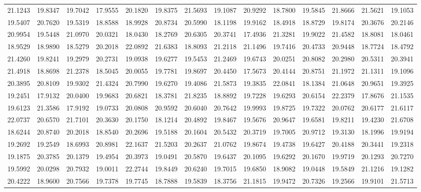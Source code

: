 \documentclass[12pt]{article}\usepackage[]{graphicx}\usepackage[]{color}
\begin{document}
\begin{landscape}
\begin{longtable}[t]{rrrrrrrrrrrrrr}
21.1243 & 19.8347 & 19.7042 & 17.9555 & 20.1820 & 19.8375 & 21.5693 & 19.1087 & 20.9292 & 18.7800 & 19.5845 & 21.8666 & 21.5621 & 19.1053\\
19.5407 & 20.7620 & 19.5319 & 18.8588 & 18.9928 & 20.8734 & 20.5990 & 18.1198 & 19.9162 & 18.4918 & 18.8729 & 19.8174 & 20.3676 & 20.2146\\
20.9954 & 19.5448 & 21.0970 & 20.0321 & 18.0430 & 18.2769 & 20.6305 & 20.3741 & 17.4936 & 21.3281 & 19.9022 & 21.4582 & 18.8081 & 18.0461\\
18.9529 & 18.9890 & 18.5279 & 20.2018 & 22.0892 & 21.6383 & 18.8093 & 21.2118 & 21.1496 & 19.7416 & 20.4733 & 20.9448 & 18.7724 & 18.4792\\
21.4260 & 19.8241 & 19.2979 & 20.2731 & 19.0938 & 19.6277 & 19.5453 & 21.2469 & 19.6743 & 20.0251 & 20.8082 & 20.2980 & 20.5311 & 20.3941\\
21.4918 & 18.8698 & 21.2378 & 18.5045 & 20.0055 & 19.7781 & 19.8697 & 20.4450 & 17.5673 & 20.4144 & 20.8751 & 21.1972 & 21.1311 & 19.1096\\
20.3895 & 20.8109 & 19.9302 & 21.4324 & 20.7990 & 19.6270 & 19.4086 & 21.5873 & 19.3835 & 22.0841 & 18.1384 & 21.0648 & 20.9651 & 19.3925\\
19.2451 & 17.9132 & 20.0400 & 19.9683 & 20.6821 & 18.3781 & 21.8235 & 18.8892 & 19.7228 & 19.6293 & 20.6154 & 22.2379 & 17.8676 & 21.1535\\
19.6123 & 21.3586 & 17.9192 & 19.0733 & 20.0808 & 20.9592 & 20.6040 & 20.7642 & 19.9993 & 19.8725 & 19.7322 & 20.0762 & 20.6177 & 21.6117\\
22.0737 & 20.6570 & 21.7101 & 20.3630 & 20.1750 & 18.1214 & 20.4892 & 19.8467 & 19.5676 & 20.9647 & 19.6581 & 19.8211 & 19.4230 & 21.6708\\
18.6244 & 20.8740 & 20.2018 & 18.8540 & 20.2696 & 19.5188 & 20.1604 & 20.5432 & 20.3719 & 19.7005 & 20.9712 & 19.3130 & 18.1996 & 19.9194\\
19.2692 & 19.2549 & 18.6993 & 20.8981 & 22.1637 & 21.5203 & 20.2637 & 21.0762 & 19.8674 & 19.4738 & 19.6427 & 20.4188 & 20.3441 & 19.2318\\
19.1875 & 20.3785 & 20.1379 & 19.4954 & 20.3973 & 19.0491 & 20.5870 & 19.6437 & 20.1095 & 19.6292 & 20.1670 & 19.9719 & 20.1293 & 20.7270\\
19.5992 & 20.0298 & 20.7932 & 19.0011 & 22.2744 & 19.8449 & 20.6240 & 19.7015 & 19.6850 & 18.9082 & 19.0448 & 19.5849 & 21.1216 & 19.1282\\
20.4222 & 18.9600 & 20.7566 & 19.7378 & 19.7745 & 18.7888 & 19.5839 & 18.3756 & 21.1815 & 19.9472 & 20.7326 & 19.2566 & 19.9101 & 21.5713\\

\end{longtable}
\end{landscape}
\end{document}
